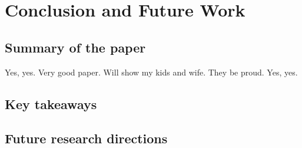 \chapter{Conclusion and Future Work}

\section{Summary of the paper}

Yes, yes. Very good paper. Will show my kids and wife. They be proud. Yes, yes.

\section{Key takeaways}

\section{Future research directions}
